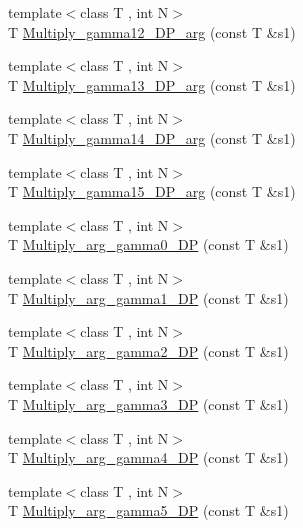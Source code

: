 \begin{DoxyCompactItemize}
\item 
{\footnotesize template$<$class T , int N$>$ }\\T \mbox{\hyperlink{namespaceENSEM_a912dc326057809bf0a27f06913ddbf55}{Multiply\+\_\+gamma12\+\_\+\+D\+P\+\_\+arg}} (const T \&s1)
\item 
{\footnotesize template$<$class T , int N$>$ }\\T \mbox{\hyperlink{namespaceENSEM_a48323c568aeb5bcdc0c398521f124a66}{Multiply\+\_\+gamma13\+\_\+\+D\+P\+\_\+arg}} (const T \&s1)
\item 
{\footnotesize template$<$class T , int N$>$ }\\T \mbox{\hyperlink{namespaceENSEM_afea32aec2f20f6bef65800f628aa2ac6}{Multiply\+\_\+gamma14\+\_\+\+D\+P\+\_\+arg}} (const T \&s1)
\item 
{\footnotesize template$<$class T , int N$>$ }\\T \mbox{\hyperlink{namespaceENSEM_a2604fc2158319ad3521cb11baf9f4827}{Multiply\+\_\+gamma15\+\_\+\+D\+P\+\_\+arg}} (const T \&s1)
\item 
{\footnotesize template$<$class T , int N$>$ }\\T \mbox{\hyperlink{namespaceENSEM_a728cdffad1181ba8d9631643b0240571}{Multiply\+\_\+arg\+\_\+gamma0\+\_\+\+DP}} (const T \&s1)
\item 
{\footnotesize template$<$class T , int N$>$ }\\T \mbox{\hyperlink{namespaceENSEM_abafa173ea01d6b8ed3f4a6053171d931}{Multiply\+\_\+arg\+\_\+gamma1\+\_\+\+DP}} (const T \&s1)
\item 
{\footnotesize template$<$class T , int N$>$ }\\T \mbox{\hyperlink{namespaceENSEM_acd7a14ccd822e91b8aed95356a6bf37c}{Multiply\+\_\+arg\+\_\+gamma2\+\_\+\+DP}} (const T \&s1)
\item 
{\footnotesize template$<$class T , int N$>$ }\\T \mbox{\hyperlink{namespaceENSEM_a1cd29e4091ddccc63172a39cb823d36a}{Multiply\+\_\+arg\+\_\+gamma3\+\_\+\+DP}} (const T \&s1)
\item 
{\footnotesize template$<$class T , int N$>$ }\\T \mbox{\hyperlink{namespaceENSEM_aab91417895cd5506b2fb592080159714}{Multiply\+\_\+arg\+\_\+gamma4\+\_\+\+DP}} (const T \&s1)
\item 
{\footnotesize template$<$class T , int N$>$ }\\T \mbox{\hyperlink{namespaceENSEM_a4fa6e39200a0df1fd7fa5731efe9641e}{Multiply\+\_\+arg\+\_\+gamma5\+\_\+\+DP}} (const T \&s1)

\end{DoxyCompactItemize}
